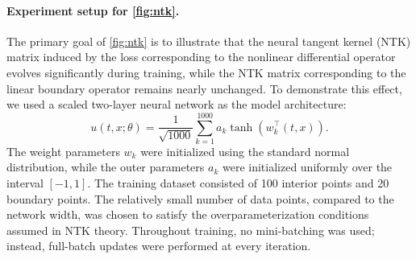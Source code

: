 \documentclass{article}
\begin{document}
\paragraph{Experiment setup for \cref{fig:ntk}.}
The primary goal of \cref{fig:ntk} is to illustrate that the neural tangent kernel (NTK) matrix induced by the loss corresponding to the nonlinear differential operator evolves significantly during training, while the NTK matrix corresponding to the linear boundary operator remains nearly unchanged. 
To demonstrate this effect, we used a scaled two-layer neural network as the model architecture:
\begin{equation*}
    u(t,x; \theta) = \frac{1}{\sqrt{1000}} \sum_{k=1}^{1000} a_k \tanh\left(w_k^\top (t,x)\right).
\end{equation*}
The weight parameters $w_k$ were initialized using the standard normal distribution, while the outer parameters $a_k$ were initialized uniformly over the interval $[-1, 1]$.  
The training dataset consisted of 100 interior points and 20 boundary points.  
The relatively small number of data points, compared to the network width, was chosen to satisfy the overparameterization conditions assumed in NTK theory.  
Throughout training, no mini-batching was used; instead, full-batch updates were performed at every iteration.
\end{document}
